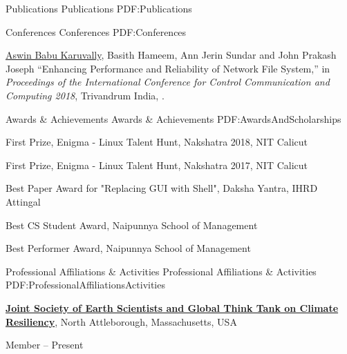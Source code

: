 \documentclass[letterpaper,MMMyyyy,nonstopmode]{simpleresumecv}
\begin{document}
\begin{Body}

\Section
{Publications}
{Publications}
{PDF:Publications}

\SubSection
{Conferences}
{Conferences}
{PDF:Conferences}

\begingroup
\renewcommand{\MaxNumberedItem}{[8888]}

\NumberedItem{[1]}
{\underline{Aswin Babu Karuvally}, Basith Hameem, Ann Jerin Sundar and John
Prakash Joseph ``Enhancing Performance and Reliability of Network File System,''
in \textit{Proceedings of the International Conference for Control Communication
and Computing 2018}, Trivandrum India,
.}

\endgroup


\Section
{Awards \&\newline
Achievements}
{Awards \& Achievements}
{PDF:AwardsAndScholarships}

\BulletItem
First Prize, Enigma - Linux Talent Hunt,
Nakshatra 2018, NIT Calicut
\hfill
{}

\BigGap
\BulletItem
First Prize, Enigma - Linux Talent Hunt,
Nakshatra 2017, NIT Calicut
\hfill
{}

\BigGap
\BulletItem
Best Paper Award for "Replacing GUI with Shell",
Daksha Yantra, IHRD Attingal
\hfill
{}

\BigGap
\BulletItem
Best CS Student Award,
Naipunnya School of Management
\hfill
{}

\BigGap
\BulletItem
Best Performer Award,
Naipunnya School of Management
\hfill
{}


\Section
{Professional Affiliations\newline
\& Activities}
{Professional Affiliations \& Activities}
{PDF:ProfessionalAffiliationsActivities}

\Entry
\href{http://www.example.com/my-society}
{\textbf{Joint Society of Earth Scientists and Global Think Tank on Climate Resiliency}},
\newline
North Attleborough, Massachusetts, USA

\Gap
\BulletItem
Member
\hfill
{} --
Present


\end{Body}
\end{document}

